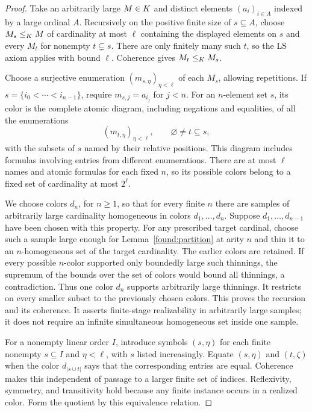 \begin{proof}
Take an arbitrarily large $M\in K$ and distinct elements
$(a_i)_{i\in A}$ indexed by a large ordinal $A$. Recursively on the
positive finite size of $s\subseteq A$, choose $M_s\leq_K M$ of
cardinality at most $\ell$ containing the displayed elements on $s$
and every $M_t$ for nonempty $t\subsetneq s$. There are only finitely
many such $t$, so the LS axiom applies with bound $\ell$. Coherence
gives $M_t\leq_K M_s$.

Choose a surjective enumeration
$(m_{s,\eta})_{\eta<\ell}$ of each $M_s$, allowing repetitions. If
$s=\{i_0<\cdots<i_{n-1}\}$, require $m_{s,j}=a_{i_j}$ for $j<n$.
For an $n$-element set $s$, its color is the complete atomic diagram,
including negations and equalities, of all the enumerations
\[
(m_{t,\eta})_{\eta<\ell},
\qquad \varnothing\ne t\subseteq s,
\]
with the subsets of $s$ named by their relative positions. This
diagram includes formulas involving entries from different
enumerations. There are at most $\ell$ names and atomic formulas
for each fixed $n$, so its possible colors belong to a fixed set of
cardinality at most $2^\ell$.

We choose colors $d_n$, for $n\geq1$, so that for every finite $n$
there are samples of arbitrarily large cardinality homogeneous in
colors $d_1,\ldots,d_n$. Suppose $d_1,\ldots,d_{n-1}$ have been
chosen with this property. For any prescribed target cardinal,
choose such a sample large enough for Lemma~\ref{found:partition}
at arity $n$ and thin it to an $n$-homogeneous set of the target
cardinality. The earlier colors are retained. If every possible
$n$-color supported only boundedly large such thinnings, the
supremum of the bounds over the set of colors would bound all
thinnings, a contradiction. Thus one color $d_n$ supports
arbitrarily large thinnings. It restricts on every smaller subset
to the previously chosen colors. This proves the recursion and
its coherence. It asserts finite-stage realizability in
arbitrarily large samples; it does not require an infinite
simultaneous homogeneous set inside one sample.

For a nonempty linear order $I$, introduce symbols $(s,\eta)$ for
each finite nonempty $s\subseteq I$ and $\eta<\ell$, with $s$
listed increasingly. Equate $(s,\eta)$ and $(t,\zeta)$ when the
color $d_{|s\cup t|}$ says that the corresponding entries are
equal. Coherence makes this independent of passage to a larger
finite set of indices. Reflexivity, symmetry, and transitivity
hold because any finite instance occurs in a realized color.
Form the quotient by this equivalence relation.


\end{proof}
